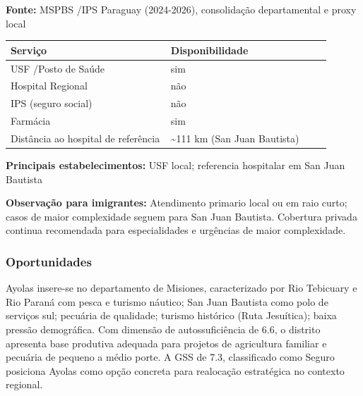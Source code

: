 \textbf{Fonte:} MSPBS /\allowbreak  IPS Paraguay (2024-2026), consolidação
departamental e proxy local

{\def\LTcaptype{none} %
\begin{longtable}{@{}>{\raggedright\arraybackslash}p{0.45\linewidth} >{\raggedright\arraybackslash}p{0.45\linewidth}@{}}
\toprule\noalign{}
Serviço & Disponibilidade \\
\midrule\noalign{}
\endhead
\bottomrule\noalign{}
\endlastfoot
USF /\allowbreak  Posto de Saúde & sim \\
Hospital Regional & não \\
IPS (seguro social) & não \\
Farmácia & sim \\
Distância ao hospital de referência & \textasciitilde111 km (San Juan
Bautista) \\
\end{longtable}
}

\textbf{Principais estabelecimentos:} USF local; referencia hospitalar
em San Juan Bautista

\textbf{Observação para imigrantes:} Atendimento primario local ou em
raio curto; casos de maior complexidade seguem para San Juan Bautista.
Cobertura privada continua recomendada para especialidades e urgências
de maior complexidade.
\newpage

\subsubsection*{Oportunidades}\label{oport-ayolas-0802}
Ayolas insere-se no departamento de Misiones, caracterizado por Rio Tebicuary e Rio Paraná com pesca e turismo náutico; San Juan Bautista como polo de serviços sul; pecuária de qualidade; turismo histórico (Ruta Jesuítica); baixa pressão demográfica. Com dimensão de autossuficiência de 6.6, o distrito apresenta base produtiva adequada para projetos de agricultura familiar e pecuária de pequeno a médio porte. A GSS de 7.3, classificado como Seguro posiciona Ayolas como opção concreta para realocação estratégica no contexto regional.

